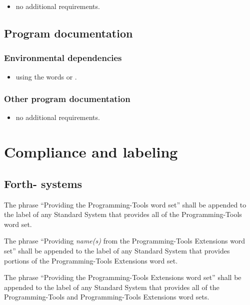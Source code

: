 \begin{itemize}
\item no additional requirements.
\end{itemize}

\subsection{Program documentation} %

\subsubsection{Environmental dependencies} %

\begin{itemize}
\item using the words  or
	.
\end{itemize}

\subsubsection{Other program documentation} %

\begin{itemize}
\item no additional requirements.
\end{itemize}

\section{Compliance and labeling} %
\subsection{Forth-\snapshot{} systems} %

The phrase ``Providing the Programming-Tools word set'' shall be
appended to the label of any Standard System that provides all of
the Programming-Tools word set.

The phrase ``Providing \emph{name(s)} from the Programming-Tools
Extensions word set'' shall be appended to the label of any Standard
System that provides portions of the Programming-Tools Extensions
word set.

The phrase ``Providing the Programming-Tools Extensions word set''
shall be appended to the label of any Standard System that provides
all of the Programming-Tools and Programming-Tools Extensions word
sets.

